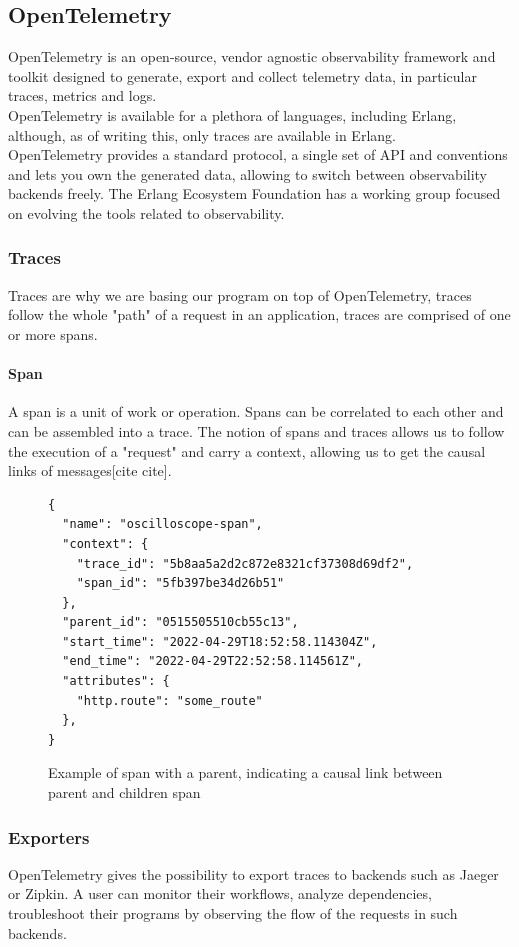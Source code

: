 \subsection{OpenTelemetry}
    OpenTelemetry is an open-source, vendor agnostic observability framework and toolkit designed to generate, export and collect telemetry data, in particular traces, metrics and logs. \\ 
    OpenTelemetry is available for a plethora of languages, including Erlang, although, as of writing this, only traces are available in Erlang. \\
    OpenTelemetry provides a standard protocol, a single set of API and conventions and lets you own the generated data, allowing to switch between observability backends freely.
    The Erlang Ecosystem Foundation has a working group focused on evolving the tools related to observability. \\
     \subsubsection{Traces}
        Traces are why we are basing our program on top of OpenTelemetry, traces follow the whole "path" of a request in an application, traces are comprised of one or more spans.
        \paragraph{Span} A span is a unit  of work or operation. Spans can be correlated to each other and can be assembled into a trace.
    The notion of spans and traces allows us to follow the execution of a "request" and carry a context, allowing us to get the causal links of messages[cite cite]. %

\begin{figure}[H]
    \begin{verbatim} 
{
  "name": "oscilloscope-span",
  "context": {
    "trace_id": "5b8aa5a2d2c872e8321cf37308d69df2",
    "span_id": "5fb397be34d26b51"
  },
  "parent_id": "0515505510cb55c13",
  "start_time": "2022-04-29T18:52:58.114304Z",
  "end_time": "2022-04-29T22:52:58.114561Z",
  "attributes": {
    "http.route": "some_route"
  },
}
    \end{verbatim}
\caption{Example of span with a parent, indicating a causal link between parent and children span}
\end{figure}

    \subsubsection{Exporters}
            OpenTelemetry gives the possibility to export traces to backends such as Jaeger or Zipkin. A user can monitor their workflows, analyze dependencies, troubleshoot their programs by observing the flow of the requests in such backends. %

